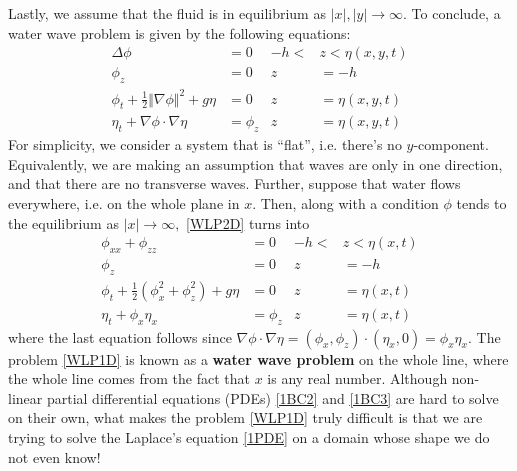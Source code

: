 \documentclass[10pt,reqno,oneside,a4paper]{article}
\begin{document}
Lastly, we assume that the fluid is in equilibrium as $|x|, |y| \to \infty.$ To conclude, a water wave problem is given by the following equations:
\begin{subequations}\label{WLP2D}
\begin{align}
\label{2PDE} \Delta \phi &= 0  &-h <&z < \eta(x,y,t) \\
\label{2BC1} \phi_z &= 0 &z &= -h  \\ 
\label{2BC2} \phi_t + \frac{1}{2} \Vert \nabla \phi \Vert^2 + g \eta &= 0 &z &= \eta(x,y,t)\\
\label{2BC3} \eta_t + \nabla \phi \cdot \nabla \eta &= \phi_z &z &= \eta(x,y,t)
\end{align}
\end{subequations}
For simplicity, we consider a system that is ``flat'', i.e. there's no $y$-component. Equivalently, we are making an assumption that waves are only in one direction, and that there are no transverse waves. Further, suppose that water flows everywhere, i.e. on the whole plane in $x$. Then, along with a condition $\phi$ tends to the equilibrium as $|x| \to \infty,$ \eqref{WLP2D} turns into 
\begin{subequations}\label{WLP1D}
\begin{align}
\label{1PDE} \phi_{xx} + \phi_{zz} &= 0  &-h <&z < \eta(x,t) \\
\label{1BC1} \phi_z &= 0 &z &= -h  \\ 
\label{1BC2} \phi_t + \frac{1}{2} (\phi_{x}^2 + \phi_{z}^2) + g \eta &= 0 &z &= \eta(x,t)\\
\label{1BC3}  \eta_t + \phi_x\eta_x &=\phi_z &z &= \eta(x,t)
\end{align}
\end{subequations}
where the last equation follows since $\nabla \phi \cdot \nabla \eta = (\phi_x, \phi_z) \cdot (\eta_x, 0) = \phi_x\eta_x.$ The problem \eqref{WLP1D} is known as a \textbf{water wave problem} on the whole line, where the whole line comes from the fact that $x$ is any real number. Although non-linear partial differential equations (PDEs) \eqref{1BC2} and \eqref{1BC3} are hard to solve on their own, what makes the problem \eqref{WLP1D} truly difficult is that we are trying to solve the Laplace's equation \eqref{1PDE} on a domain whose shape we do not even know!

\end{document}
